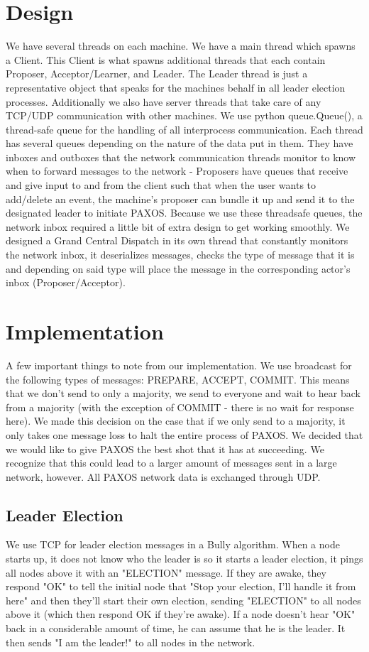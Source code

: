 \documentclass[11pt]{article} %
\begin{document}
\section{Design}
We have several threads on each machine. We have a main thread which spawns a Client. This Client is what spawns additional threads that each contain Proposer, Acceptor/Learner, and Leader. The Leader thread is just a representative object that speaks for the machines behalf in all leader election processes. Additionally we also have server threads that take care of any TCP/UDP communication with other machines. We use python queue.Queue(), a thread-safe queue for the handling of all interprocess communication. Each thread has several queues depending on the nature of the data put in them. They have inboxes and outboxes that the network communication threads monitor to know when to forward messages to the network - Proposers have queues that receive and give input to and from the client such that when the user wants to add/delete an event, the machine's proposer can bundle it up and send it to the designated leader to initiate PAXOS. Because we use these threadsafe queues, the network inbox required a little bit of extra design to get working smoothly. We designed a Grand Central Dispatch in its own thread that constantly monitors the network inbox, it deserializes messages, checks the type of message that it is and depending on said type will place the message in the corresponding actor's inbox (Proposer/Acceptor).

\section{Implementation}
A few important things to note from our implementation. We use broadcast for the following types of messages: PREPARE, ACCEPT, COMMIT. This means that we don't send to only a majority, we send to everyone and wait to hear back from a majority (with the exception of COMMIT - there is no wait for response here). We made this decision on the case that if we only send to a majority, it only takes one message loss to halt the entire process of PAXOS. We decided that we would like to give PAXOS the best shot that it has at succeeding. We recognize that this could lead to a larger amount of messages sent in a large network, however. All PAXOS network data is exchanged through UDP.

\subsection{Leader Election}
We use TCP for leader election messages in a Bully algorithm. When a node starts up, it does not know who the leader is so it starts a leader election, it pings all nodes above it with an "ELECTION" message. If they are awake, they respond "OK" to tell the initial node that "Stop your election, I'll handle it from here" and then they'll start their own election, sending "ELECTION" to all nodes above it (which then respond OK if they're awake). If a node doesn't hear "OK" back in a considerable amount of time, he can assume that he is the leader. It then sends "I am the leader!" to all nodes in the network.
\end{document}
